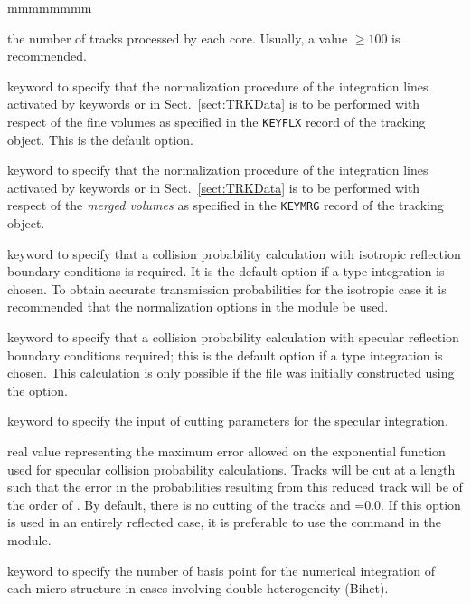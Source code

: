 \begin{ListeDeDescription}{mmmmmmmm}
\item[\dusa{nbatch}] the number of tracks processed by each core. Usually, a value  $\ge 100$ is recommended.

\item[\moc{TREG}] keyword to specify that the normalization procedure of the integration lines activated by keywords 
or  in Sect.~\ref{sect:TRKData} is to be performed with respect of the fine volumes as specified in the {\tt KEYFLX} record
of the tracking object. This is the default option.

\item[\moc{TMER}] keyword to specify that the normalization procedure of the integration lines activated by keywords 
or  in Sect.~\ref{sect:TRKData} is to be performed with respect of the {\sl merged volumes} as specified in the {\tt KEYMRG} record
of the tracking object.

\item[\moc{PISO}] keyword to specify that a collision probability calculation
with isotropic reflection boundary conditions is required. It is the default
option if a  type integration is chosen. To obtain accurate
transmission probabilities for the isotropic case it is recommended that the
normalization options in the  module be used.

\item[\moc{PSPC}] keyword to specify that  a collision probability calculation
with specular reflection boundary conditions required; this is the default
option if a  type integration is chosen. This calculation is only
possible if the file was initially constructed using the  option. 

\item[\moc{CUT}] keyword to specify the input of cutting parameters for the
specular integration.

\item[\dusa{pcut}] real value representing the maximum error allowed on the
exponential function used for specular collision probability calculations.
Tracks will be cut at a length such that the error in the probabilities
resulting from this reduced track will be of the order of . By
default, there is no cutting of the tracks and =0.0. If this option
is used in an entirely reflected case, it is preferable to use the 
command in the  module.

\item[\moc{QUAB}] keyword to specify the number of basis point for the
numerical integration of each micro-structure in cases involving double
heterogeneity (Bihet).


\end{ListeDeDescription}
